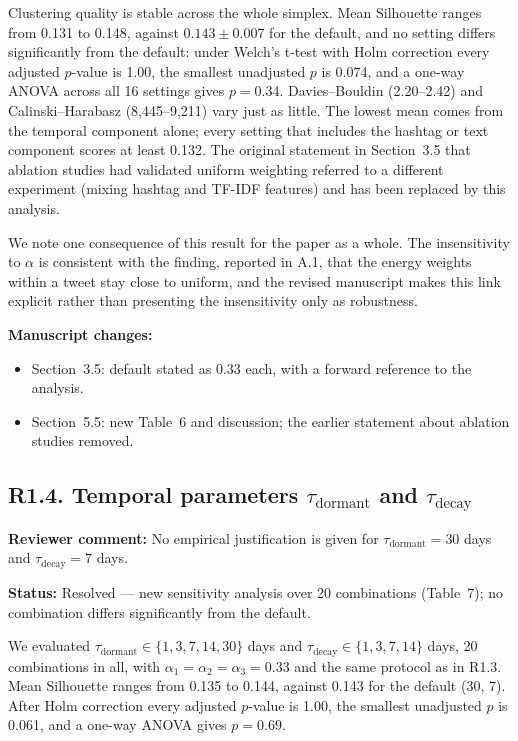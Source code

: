 \documentclass[11pt,a4paper]{article}
\newcommand{\status}[1]{\textbf{\color{statusgreen}Status:} #1}
\newcommand{\parthead}[1]{\par\medskip\textbf{#1}\par}
\begin{document}
Clustering quality is stable across the whole simplex. Mean Silhouette ranges from 0.131 to 0.148, against $0.143 \pm 0.007$ for the default, and no setting differs significantly from the default: under Welch's t-test with Holm correction every adjusted $p$-value is 1.00, the smallest unadjusted $p$ is 0.074, and a one-way ANOVA across all 16 settings gives $p = 0.34$. Davies--Bouldin (2.20--2.42) and Calinski--Harabasz (8,445--9,211) vary just as little. The lowest mean comes from the temporal component alone; every setting that includes the hashtag or text component scores at least 0.132. The original statement in Section~3.5 that ablation studies had validated uniform weighting referred to a different experiment (mixing hashtag and TF-IDF features) and has been replaced by this analysis.

We note one consequence of this result for the paper as a whole. The insensitivity to $\alpha$ is consistent with the finding, reported in A.1, that the energy weights within a tweet stay close to uniform, and the revised manuscript makes this link explicit rather than presenting the insensitivity only as robustness.

\parthead{Manuscript changes:}
\begin{itemize}
\item Section~3.5: default stated as 0.33 each, with a forward reference to the analysis.
\item Section~5.5: new Table~6 and discussion; the earlier statement about ablation studies removed.
\end{itemize}

\subsection{R1.4. Temporal parameters $\tau_{\text{dormant}}$ and $\tau_{\text{decay}}$}

\begin{revcomment}
\textbf{Reviewer comment:} No empirical justification is given for $\tau_{\text{dormant}} = 30$ days and $\tau_{\text{decay}} = 7$ days.
\end{revcomment}

\status{Resolved --- new sensitivity analysis over 20 combinations (Table~7); no combination differs significantly from the default.}

We evaluated $\tau_{\text{dormant}} \in \{1, 3, 7, 14, 30\}$ days and $\tau_{\text{decay}} \in \{1, 3, 7, 14\}$ days, 20 combinations in all, with $\alpha_1 = \alpha_2 = \alpha_3 = 0.33$ and the same protocol as in R1.3. Mean Silhouette ranges from 0.135 to 0.144, against 0.143 for the default (30, 7). After Holm correction every adjusted $p$-value is 1.00, the smallest unadjusted $p$ is 0.061, and a one-way ANOVA gives $p = 0.69$.
\end{document}

